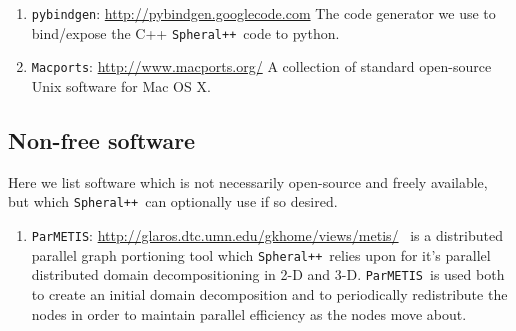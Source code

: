 \documentclass{article}
\newcommand{\Spheral}{{\tt Spheral++}}
\begin{document}
\begin{enumerate}

\item \verb+pybindgen+: \url{http://pybindgen.googlecode.com} \newline
  The code generator we use to bind/expose the C++ \Spheral\ code to python.

\item\verb+Macports+: \url{http://www.macports.org/} \newline
\label{Macports.sec}
A collection of standard open-source Unix software for Mac OS X.

\end{enumerate}

\subsection{Non-free software}
\label{nonfree.sec}
Here we list software which is not necessarily open-source and freely available,
but which \Spheral\ can optionally use if so desired.
\newcommand{\Parmetis}{{\tt ParMETIS}}
\begin{enumerate}
\item \Parmetis: \label{parmetis.item}
  \url{http://glaros.dtc.umn.edu/gkhome/views/metis/} \newline \Parmetis\ is a
  distributed parallel graph portioning tool which \Spheral\ relies upon for
  it's parallel distributed domain decompositioning in 2-D and 3-D.
  \Parmetis\ is used both to create an initial domain decomposition and to
  periodically redistribute the nodes in order to maintain parallel efficiency
  as the nodes move about.
\end{enumerate}
\end{document}
